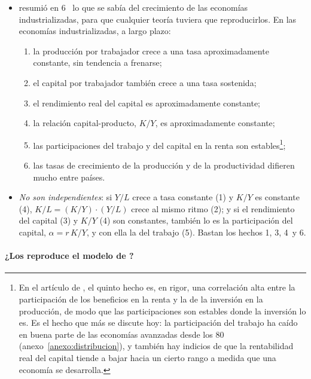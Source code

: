 \documentclass[11pt]{article}
\begin{document}
\begin{itemize}
\item \textcite{Kaldor1961} resumió en 6~ lo que se sabía del crecimiento de las economías industrializadas, para que cualquier teoría tuviera que reproducirlos. En las economías industrializadas, a largo plazo:
  \begin{enumerate}
  \item la producción por trabajador crece a una tasa aproximadamente constante, sin tendencia a frenarse;
  \item el capital por trabajador también crece a una tasa sostenida;
  \item el rendimiento real del capital es aproximadamente constante;
  \item la relación capital-producto, $K/Y$, es aproximadamente constante;
  \item las participaciones del trabajo y del capital en la renta son estables\footnote{En el artículo de \textcite{Kaldor1961}, el quinto hecho es, en rigor, una correlación alta entre la participación de los beneficios en la renta y la de la inversión en la producción, de modo que las participaciones son estables donde la inversión lo es. Es el hecho que más se discute hoy: la participación del trabajo ha caído en buena parte de las economías avanzadas desde los 80 (anexo~\ref{anexo:distribucion}), y también hay indicios de que la rentabilidad real del capital tiende a bajar hacia un cierto rango a medida que una economía se desarrolla.};
  \item las tasas de crecimiento de la producción y de la productividad difieren mucho entre países.
  \end{enumerate}
\item \emph{No son independientes}: si $Y/L$ crece a tasa constante (1) y $K/Y$ es constante (4), $K/L=(K/Y)\cdot(Y/L)$ crece al mismo ritmo (2); y si el rendimiento del capital (3) y $K/Y$ (4) son constantes, también lo es la participación del capital, $\alpha=r\,K/Y$, y con ella la del trabajo (5). Bastan los hechos 1, 3, 4~y 6.
\end{itemize}

\paragraph{¿Los reproduce el modelo de ?}
\end{document}
